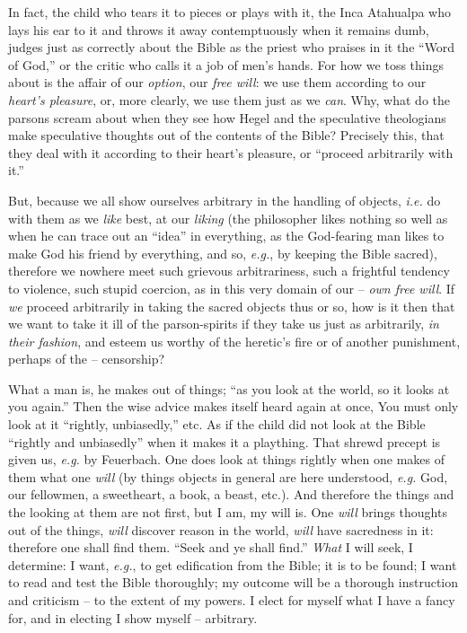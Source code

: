 \documentclass[12pt,a4paper]{book}
\begin{document}
In fact, the child who tears it to pieces or plays with it, the Inca Atahualpa 
who lays his ear to it and throws it away contemptuously when it remains dumb, 
judges just as correctly about the Bible as the priest who praises in it the 
``Word of God,'' or the critic who calls it a job of men's hands. For how we 
toss things about is the affair of our \textit{option}, our \textit{free 
will}: we use them according to our \textit{heart's pleasure}, or, more 
clearly, we use them just as we \textit{can}. Why, what do the parsons scream 
about when they see how Hegel and the speculative theologians make speculative 
thoughts out of the contents of the Bible? Precisely this, that they deal with 
it according to their heart's pleasure, or ``proceed arbitrarily with it.''

But, because we all show ourselves arbitrary in the handling of objects, 
\textit{i.e.} do with them as we \textit{like} best, at our \textit{liking} 
(the philosopher likes nothing so well as when he can trace out an ``idea'' 
in everything, as the God-fearing man likes to make God his friend by 
everything, and so, \textit{e.g.}, by keeping the Bible sacred), therefore we 
nowhere meet such grievous arbitrariness, such a frightful tendency to 
violence, such stupid coercion, as in this very domain of our -- \textit{own 
free will}. If \textit{we} proceed arbitrarily in taking the sacred objects 
thus or so, how is it then that we want to take it ill of the parson-spirits 
if they take us just as arbitrarily, \textit{in their fashion}, and esteem us 
worthy of the heretic's fire or of another punishment, perhaps of the -- 
censorship?

What a man is, he makes out of things; ``as you look at the world, so it 
looks at you again.'' Then the wise advice makes itself heard again at once, 
You must only look at it ``rightly, unbiasedly,'' etc. As if the child did 
not look at the Bible ``rightly and unbiasedly'' when it makes it a 
plaything. That shrewd precept is given us, \textit{e.g.} by Feuerbach. One 
does look at things rightly when one makes of them what one \textit{will} (by 
things objects in general are here understood, \textit{e.g.} God, our 
fellowmen, a sweetheart, a book, a beast, etc.). And therefore the things and 
the looking at them are not first, but I am, my will is. One \textit{will} 
brings thoughts out of the things, \textit{will} discover reason in the world, 
\textit{will} have sacredness in it: therefore one shall find them. ``Seek 
and ye shall find.'' \textit{What} I will seek, I determine: I want, 
\textit{e.g.}, to get edification from the Bible; it is to be found; I want 
to read and test the Bible thoroughly; my outcome will be a thorough 
instruction and criticism -- to the extent of my powers. I elect for myself 
what I have a fancy for, and in electing I show myself -- arbitrary.
\end{document}
